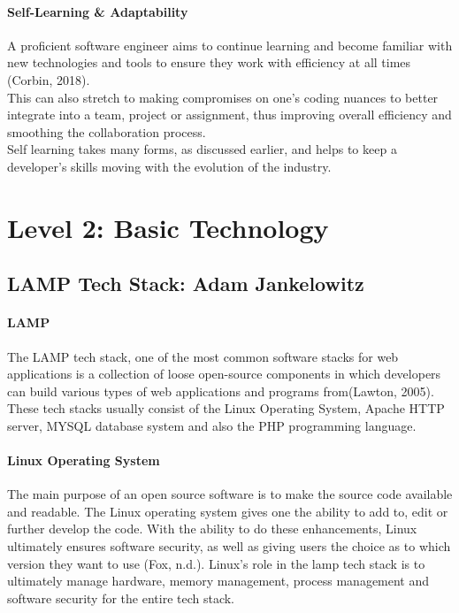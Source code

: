 \documentclass[a4paper, 11pt]{report}
\begin{document}
	\paragraph{Self-Learning \& Adaptability} A proficient software engineer aims to continue learning and become familiar with new technologies and tools to ensure they work with efficiency at all times (Corbin, 2018).
	\\This can also stretch to making compromises on one's coding nuances to better integrate into a team, project or assignment, thus improving overall efficiency and smoothing the collaboration process.
	\\Self learning takes many forms, as discussed earlier, and helps to keep a developer's skills moving with the evolution of the industry.


	\newpage
	\section{Level 2: Basic Technology}

	\subsection{LAMP Tech Stack: Adam Jankelowitz}
	\paragraph {LAMP} The LAMP tech stack, one of the most common software stacks for web applications is a collection of loose open-source components in which developers can build various types of web applications and programs from(Lawton, 2005). These tech stacks usually consist of the Linux Operating System, Apache HTTP server, MYSQL database system and also the PHP programming language.

	\paragraph {Linux Operating System} The main purpose of an open source software is to make the source code available and readable. The Linux operating system gives one the ability to add to, edit or further develop the code. With the ability to do these enhancements, Linux ultimately ensures software security, as well as giving users the choice as to which version they want to use (Fox, n.d.). Linux’s role in the lamp tech stack is to ultimately manage hardware, memory management, process management and software security for the entire tech stack.
\end{document}
